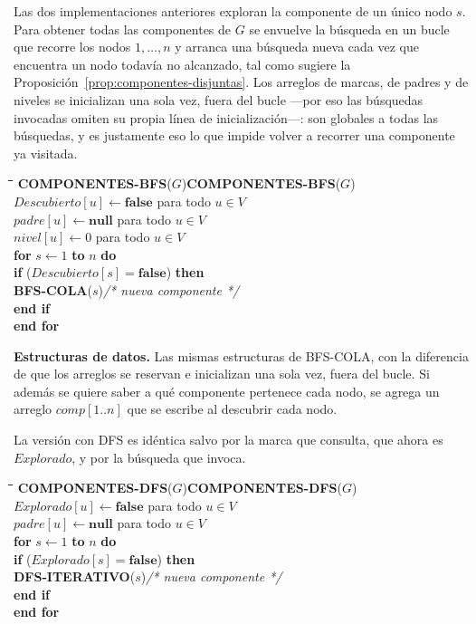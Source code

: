 \documentclass[12pt, spanish, oneside, openany]{book}
\newcommand{\pl}[1]{\makebox[1.6em][r]{\texttt{\footnotesize #1}}\hspace{0.9em}}
\newenvironment{pseudo}[1]{%
  \begin{center}%
  \begin{mdframed}[style=pseudobox]%
  \small
  \begin{tabbing}%
  \hspace{2.5em}\=\hspace{1.5em}\=\hspace{1.5em}\=\hspace{1.5em}\=\hspace{1.5em}\=\kill
  \def\pseudotitulo{#1}\ifx\pseudotitulo\empty\else#1\\[3pt]\fi}%
  {\end{tabbing}\end{mdframed}\end{center}}
\newenvironment{estructuras}%
  {\begin{center}\begin{minipage}{0.93\textwidth}\begin{mdframed}[style=estrbox]%
   \small\textbf{Estructuras de datos.}\;}%
  {\end{mdframed}\end{minipage}\end{center}}
\theoremstyle{uprightplain}
\theoremstyle{definition}
\theoremstyle{remark}
\theoremstyle{definition}
\begin{document}
Las dos implementaciones anteriores exploran la componente de un único nodo $s$. Para obtener todas las componentes de $G$ se envuelve la búsqueda en un bucle que recorre los nodos $1,\dots,n$ y arranca una búsqueda nueva cada vez que encuentra un nodo todavía no alcanzado, tal como sugiere la Proposición~\ref{prop:componentes-disjuntas}. Los arreglos de marcas, de padres y de niveles se inicializan una sola vez, fuera del bucle ---por eso las búsquedas invocadas omiten su propia línea de inicialización---: son globales a todas las búsquedas, y es justamente eso lo que impide volver a recorrer una componente ya visitada.

\begin{pseudo}{\textbf{COMPONENTES-BFS}($G$)}
\pl{1}\> $\mathit{Descubierto}[u] \leftarrow \textbf{false}$ para todo $u\in V$\\
\pl{2}\> $\mathit{padre}[u] \leftarrow \textbf{null}$ para todo $u\in V$\\
\pl{3}\> $\mathit{nivel}[u] \leftarrow 0$ para todo $u\in V$\\
\pl{4}\> \textbf{for} $s \leftarrow 1$ \textbf{to} $n$ \textbf{do}\\
\pl{5}\>\> \textbf{if} ($\mathit{Descubierto}[s] = \textbf{false}$) \textbf{then}\\
\pl{6}\>\>\> \textbf{BFS-COLA}($s$)\qquad \textit{/* nueva componente */}\\
\pl{7}\>\> \textbf{end if}\\
\pl{8}\> \textbf{end for}
\end{pseudo}

\begin{estructuras}
Las mismas estructuras de BFS-COLA, con la diferencia de que los
arreglos se reservan e inicializan una sola vez, fuera del bucle. Si además se
quiere saber a qué componente pertenece cada nodo, se agrega un arreglo
$\mathit{comp}[1..n]$ que se escribe al descubrir cada nodo.
\end{estructuras}


La versión con DFS es idéntica salvo por la marca que consulta, que ahora es $\mathit{Explorado}$, y por la búsqueda que invoca.

\begin{pseudo}{\textbf{COMPONENTES-DFS}($G$)}
\pl{1}\> $\mathit{Explorado}[u] \leftarrow \textbf{false}$ para todo $u\in V$\\
\pl{2}\> $\mathit{padre}[u] \leftarrow \textbf{null}$ para todo $u\in V$\\
\pl{3}\> \textbf{for} $s \leftarrow 1$ \textbf{to} $n$ \textbf{do}\\
\pl{4}\>\> \textbf{if} ($\mathit{Explorado}[s] = \textbf{false}$) \textbf{then}\\
\pl{5}\>\>\> \textbf{DFS-ITERATIVO}($s$)\qquad \textit{/* nueva componente */}\\
\pl{6}\>\> \textbf{end if}\\
\pl{7}\> \textbf{end for}
\end{pseudo}
\end{document}
